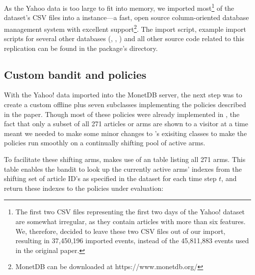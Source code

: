 \documentclass{jss}
\begin{document}
As the Yahoo data is too large to fit into memory, we imported most\footnote{The first two CSV files representing the first two days of the Yahoo! dataset are somewhat irregular, as they contain articles with more than six features. We, therefore, decided to leave these two CSV files out of our import, resulting in 37,450,196 imported events, instead of the 45,811,883 events used in the original paper.} of the dataset's CSV files into a  \citep{IdreosGNMMK12} instance---a fast, open source column-oriented database management system with excellent  support\footnote{MonetDB can be downloaded at https://www.monetdb.org/}. The import script, example import scripts for several other databases (, , ) and all other source code related to this replication can be found in the package's  directory.

\subsection{Custom bandit and policies} \label{custom}

With the Yahoo! data imported into the MonetDB server, the next step was to create a custom offline  plus seven  subclasses implementing the policies described in the \cite{Li2010} paper. Though most of these policies were already implemented in , the fact that only a subset of all 271 articles or arms are shown to a visitor at a time meant we needed to make some minor changes to 's exisiting classes to make the policies run smoothly on a continually shifting pool of active arms.

To facilitate these shifting arms,  makes use of an  table listing all 271 arms. This table enables the bandit to look up the currently active arms' indexes from the shifting set of article ID's as specified in the dataset for each time step $t$, and return these indexes to the policies under evaluation:

\end{document}
